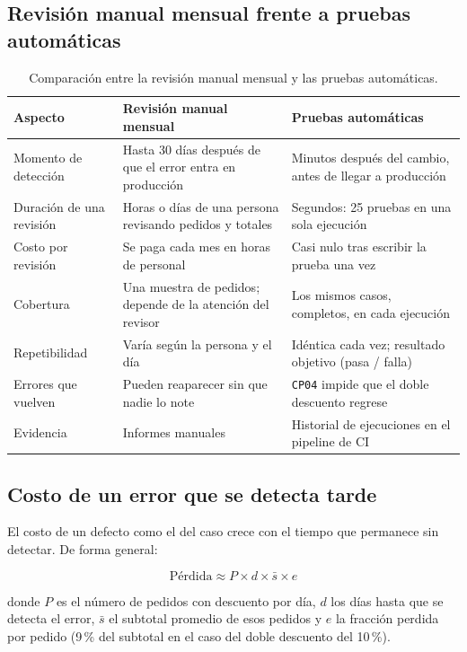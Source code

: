 \documentclass[11pt,a4paper]{article}
\begin{document}
\subsection{Revisión manual mensual frente a pruebas automáticas}

\begin{table}[H]
\centering
\begin{tabularx}{\textwidth}{@{}l L L@{}}
\toprule
\textbf{Aspecto} & \textbf{Revisión manual mensual} & \textbf{Pruebas automáticas}\\
\midrule
Momento de detección & Hasta 30 días después de que el error entra en producción & Minutos después del cambio, antes de llegar a producción\\
Duración de una revisión & Horas o días de una persona revisando pedidos y totales & Segundos: 25 pruebas en una sola ejecución\\
Costo por revisión & Se paga cada mes en horas de personal & Casi nulo tras escribir la prueba una vez\\
Cobertura & Una muestra de pedidos; depende de la atención del revisor & Los mismos casos, completos, en cada ejecución\\
Repetibilidad & Varía según la persona y el día & Idéntica cada vez; resultado objetivo (pasa / falla)\\
Errores que vuelven & Pueden reaparecer sin que nadie lo note & \texttt{CP04} impide que el doble descuento regrese\\
Evidencia & Informes manuales & Historial de ejecuciones en el pipeline de CI\\
\bottomrule
\end{tabularx}
\caption{Comparación entre la revisión manual mensual y las pruebas automáticas.}
\label{tab:manual-vs-auto}
\end{table}

\subsection{Costo de un error que se detecta tarde}

El costo de un defecto como el del caso crece con el tiempo que permanece sin detectar. De forma
general:

\begin{equation}
\text{Pérdida} \approx P \times d \times \bar{s} \times e
\label{eq:perdida}
\end{equation}

donde $P$ es el número de pedidos con descuento por día, $d$ los días hasta que se detecta el error,
$\bar{s}$ el subtotal promedio de esos pedidos y $e$ la fracción perdida por pedido (9\,\% del
subtotal en el caso del doble descuento del 10\,\%).
\end{document}
